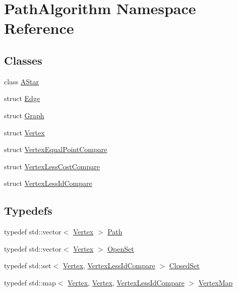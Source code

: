 \hypertarget{namespace_path_algorithm}{}\section{Path\+Algorithm Namespace Reference}
\label{namespace_path_algorithm}
\subsection*{Classes}
\begin{DoxyCompactItemize}
\item 
class \hyperlink{class_path_algorithm_1_1_a_star}{A\+Star}
\item 
struct \hyperlink{struct_path_algorithm_1_1_edge}{Edge}
\item 
struct \hyperlink{struct_path_algorithm_1_1_graph}{Graph}
\item 
struct \hyperlink{struct_path_algorithm_1_1_vertex}{Vertex}
\item 
struct \hyperlink{struct_path_algorithm_1_1_vertex_equal_point_compare}{Vertex\+Equal\+Point\+Compare}
\item 
struct \hyperlink{struct_path_algorithm_1_1_vertex_less_cost_compare}{Vertex\+Less\+Cost\+Compare}
\item 
struct \hyperlink{struct_path_algorithm_1_1_vertex_less_id_compare}{Vertex\+Less\+Id\+Compare}
\end{DoxyCompactItemize}
\subsection*{Typedefs}
\begin{DoxyCompactItemize}
\item 
typedef std\+::vector$<$ \hyperlink{struct_path_algorithm_1_1_vertex}{Vertex} $>$ \hyperlink{namespace_path_algorithm_a7f2958a43117506f3cb6dc9409a22c0d}{Path}
\item 
typedef std\+::vector$<$ \hyperlink{struct_path_algorithm_1_1_vertex}{Vertex} $>$ \hyperlink{namespace_path_algorithm_a999fc5baea7d1f71e42570630a297029}{Open\+Set}
\item 
typedef std\+::set$<$ \hyperlink{struct_path_algorithm_1_1_vertex}{Vertex}, \hyperlink{struct_path_algorithm_1_1_vertex_less_id_compare}{Vertex\+Less\+Id\+Compare} $>$ \hyperlink{namespace_path_algorithm_ac027c23e4b4c237b6eb96fc63d79266f}{Closed\+Set}
\item 
typedef std\+::map$<$ \hyperlink{struct_path_algorithm_1_1_vertex}{Vertex}, \hyperlink{struct_path_algorithm_1_1_vertex}{Vertex}, \hyperlink{struct_path_algorithm_1_1_vertex_less_id_compare}{Vertex\+Less\+Id\+Compare} $>$ \hyperlink{namespace_path_algorithm_ac8a52a9740a0bfa959810bd92e08d962}{Vertex\+Map}
\end{DoxyCompactItemize}

